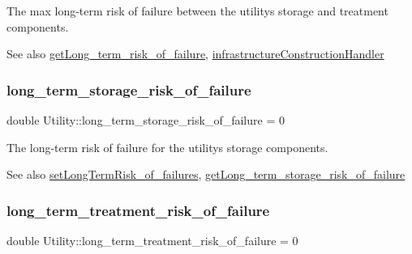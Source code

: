 The max long-\/term risk of failure between the utility\textquotesingle{}s storage and treatment components. 

\begin{DoxySeeAlso}{See also}
\mbox{\hyperlink{classUtility_a6ac587bf46d7147f9722dc4c89abbb3b}{get\+Long\+\_\+term\+\_\+risk\+\_\+of\+\_\+failure}}, \mbox{\hyperlink{classUtility_ae93114986578d3d3fbae56f271ac7df6}{infrastructure\+Construction\+Handler}} 
\end{DoxySeeAlso}
\mbox{\label{classUtility_a6943bf861df9229f3cbeaa2e6ca8ac55}} 
\subsubsection{\texorpdfstring{long\+\_\+term\+\_\+storage\+\_\+risk\+\_\+of\+\_\+failure}{long\_term\_storage\_risk\_of\_failure}}
{\footnotesize\ttfamily double Utility\+::long\+\_\+term\+\_\+storage\+\_\+risk\+\_\+of\+\_\+failure = 0\hspace{0.3cm}{\ttfamily [private]}}



The long-\/term risk of failure for the utility\textquotesingle{}s storage components. 

\begin{DoxySeeAlso}{See also}
\mbox{\hyperlink{classUtility_a0a5ccfc2e606ef46f1c1a52707fb5071}{set\+Long\+Term\+Risk\+\_\+of\+\_\+failures}}, \mbox{\hyperlink{classUtility_a3c35a6860d65f40648238b2719377bf6}{get\+Long\+\_\+term\+\_\+storage\+\_\+risk\+\_\+of\+\_\+failure}} 
\end{DoxySeeAlso}
\mbox{\label{classUtility_a326996f6fae2a0f897e3816e374853f5}} 
\subsubsection{\texorpdfstring{long\+\_\+term\+\_\+treatment\+\_\+risk\+\_\+of\+\_\+failure}{long\_term\_treatment\_risk\_of\_failure}}
{\footnotesize\ttfamily double Utility\+::long\+\_\+term\+\_\+treatment\+\_\+risk\+\_\+of\+\_\+failure = 0\hspace{0.3cm}{\ttfamily [private]}}



